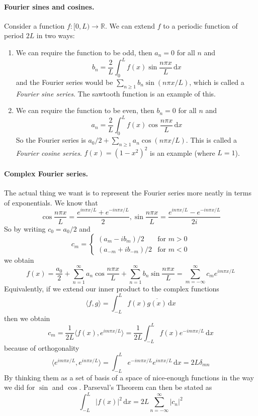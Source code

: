 \documentclass[a4paper]{article}
\begin{document}
\paragraph{Fourier sines and cosines.}
Consider a function $f:[0,L)\to\mathbb R$.
We can extend $f$ to a periodic function of period $2L$ in two ways:
\begin{enumerate}
    \item We can require the function to be odd, then $a_n=0$ for all $n$ and
    \begin{equation}
        b_n=\frac{2}{L}\int_0^Lf(x)\sin\frac{n\pi x}{L}\,\mathrm dx
    \end{equation}
    and the Fourier series would be $\sum_{n\ge 1}b_n\sin(n\pi x/L)$, which is called a \textit{Fourier sine series}.
    The sawtooth function is an example of this.
    \item We can require the function to be even, then $b_n=0$ for all $n$ and
    \begin{equation}
        a_n=\frac{2}{L}\int_0^Lf(x)\cos\frac{n\pi x}{L}\,\mathrm dx
    \end{equation}
    So the Fourier series is $a_0/2+\sum_{n\ge 1}a_n\cos(n\pi x/L)$.
    This is called a \textit{Fourier cosine series}.
    $f(x)=(1-x^2)^2$ is an example (where $L=1$).
\end{enumerate}
\paragraph{Complex Fourier series.}
The actual thing we want is to represent the Fourier series more neatly in terms of exponentials.
We know that
$$\cos\frac{n\pi x}{L}=\frac{e^{in\pi x/L}+e^{-in\pi x/L}}{2},\sin\frac{n\pi x}{L}=\frac{e^{in\pi x/L}-e^{-in\pi x/L}}{2i}$$
So by writing $c_0=a_0/2$ and
$$c_m=\begin{cases}
    (a_m-ib_m)/2&\text{for $m>0$}\\
    (a_{-m}+ib_{-m})/2&\text{for $m<0$}
\end{cases}$$
we obtain
\begin{equation}
    f(x)=\frac{a_0}{2}+\sum_{n=1}^\infty a_n\cos\frac{n\pi x}{L}+\sum_{n=1}^\infty b_n\sin\frac{n\pi x}{L}=\sum_{m=-\infty}^\infty c_me^{im\pi x/L}
\end{equation}
Equivalently, if we extend our inner product to the complex functions
$$\langle f,g\rangle=\int_{-L}^Lf(x)\overline{g(x)}\,\mathrm dx$$
then we obtain
\begin{equation}
    c_m=\frac{1}{2L}\langle f(x),e^{im\pi x/L}\rangle=\frac{1}{2L}\int_{-L}^Lf(x)e^{-im\pi x/L}\,\mathrm dx
\end{equation}
because of orthogonality
\begin{equation}
    \langle e^{im\pi x/L},e^{in\pi x/L}\rangle= \int_{-L}^{L} e^{-im\pi x/L}e^{in\pi x/L} \,\mathrm{d}x=2L\delta_{mn}
\end{equation}
By thinking them as a set of basis of a space of nice-enough functions in the way we did for $\sin$ and $\cos$.
Parseval's Theorem can then be stated as
$$\int_{-L}^L|f(x)|^2\,\mathrm dx=2L\sum_{n=-\infty}^\infty|c_n|^2$$
\end{document}
